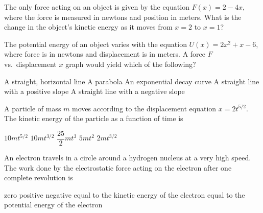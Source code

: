 \documentclass{../../oss-apphys-exam}
\begin{document}
\begin{multicols*}{2}
\begin{questions}
    
    \question The only force acting on an object is given by the equation
    $F(x)=2-4x$, where the force is measured in newtons and position in meters.
    What is the change in the object's kinetic energy as it moves from $x=2$ to
    $x=1$?
    
    \question The potential energy of an object varies with the equation
    $U(x)=2x^2+x-6$, where force is in newtons and displacement is in meters. A
    force $F$ vs.\ displacement $x$ graph would yield which of the following?
    \begin{choices}
      \choice A straight, horizontal line
      \choice A parabola
      \choice An exponential decay curve
      \choice A straight line with a positive slope
      \choice A straight line with a negative slope
    \end{choices}
    
    \question A particle of mass $m$ moves according to the displacement
    equation $x=2t^{5/2}$. The kinetic energy of the particle as a function of
    time is
    \begin{choices}
      \choice $10mt^{5/2}$
      \choice $10mt^{3/2}$
      \choice $\dfrac{25}2mt^3$
      \choice $5mt^2$
      \choice $2mt^{3/2}$
    \end{choices}
    
    \question An electron travels in a circle around a hydrogen nucleus at a
    very high speed. The work done by the electrostatic force acting on the
    electron after one complete revolution is
    \begin{choices}
      \choice zero
      \choice positive
      \choice negative
      \choice equal to the kinetic energy of the electron
      \choice equal to the potential energy of the electron
    \end{choices}
    

\end{questions}
\end{multicols*}
\end{document}
